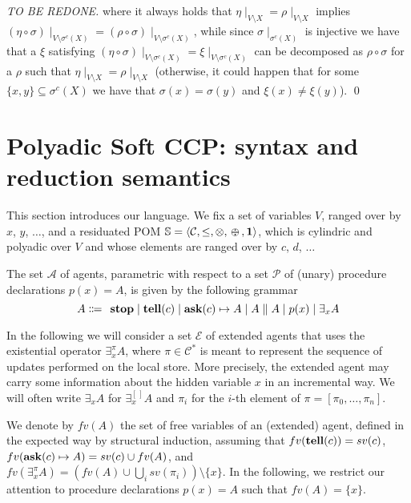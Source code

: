 \documentclass{llncs}
\def\1{{\mathbf 1}}
\newcommand{\tell}{{\bf tell}}
\newcommand{\ask}{{\bf ask}}
\newcommand{\ostop}{{\bf stop}}
\def\1{{\mathbf 1}}
\def\odiv{\, {\ominus\hspace{-7.7pt} \div} \,}
\begin{document}
\begin{proof}[TO BE REDONE]
\noindent
where it always holds that $\eta\mid_{V \setminus X} = \rho\mid_{V \setminus X}$ implies $(\eta\circ \sigma)\mid_{V \setminus \sigma^{c}(X)} = (\rho\circ \sigma)\mid_{V \setminus \sigma^{c}(X)}$,
while since $\sigma \mid_{\sigma^c(X)}$ is injective we have that
a $\xi$ satisfying $(\eta \circ \sigma)\mid_{V \setminus \sigma^{c}(X)} = \xi\mid_{V \setminus \sigma^{c}(X)}$ can be decomposed as $\rho\circ \sigma$
for a $\rho$ such that $\eta\mid_{V \setminus X} = \rho\mid_{V \setminus X}$
(otherwise, it could happen that for some $\{x, y\} \subseteq \sigma^c(X)$ we have that $\sigma(x) =\sigma(y)$ and 
$\xi(x) \neq \xi(y)$).
\qed
\end{proof}

\section{Polyadic Soft CCP: syntax and reduction semantics}\label{sec:detpolyadicCCP}
This section introduces our language.
We fix a set of variables $V$, ranged over by $x$, $y$, $\ldots$, and 
a residuated POM $\mathbb S = \langle {\mathcal C}, \leq, \otimes, \odiv, \1\rangle$, 
which is cylindric and polyadic over $V$ and whose elements
are ranged over by $c$, $d$, $\ldots$

\begin{definition}[Agents]%
The set $\mathcal{A}$ of agents, %
parametric with respect to a set $\mathcal{P}$ of (unary) procedure declarations $p(x) = A$,
is given by the following grammar
\[ A \Coloneqq \: \: \mathit{\ostop} \mid \textit{\tell}(c)  \mid \textit{\ask}(c) \mapsto A \mid A \parallel A \mid %
p(x) \mid \exists_x A\]  
\end{definition}

In the following we will consider 
a set $\mathcal{E}$ of extended agents that uses the existential operator $\exists^{\pi}_x A$, 
where $\pi \in {\mathcal C}^\ast$ is meant to represent the sequence of updates performed on the local store. 
More precisely, the extended agent may carry some information about the hidden variable 
$x$ in an incremental way. We will often write $\exists_x A$ for $\exists^{[ \,]}_x A$ and $\pi_i$ for 
the $i$-th element of $\pi = [ \pi_0, \ldots, \pi_n]$.

We denote by $fv(A)$ the set of free variables of an (extended) agent, defined in the expected way 
by structural induction, assuming that $fv(\tell(c)) = sv(c)$,
$fv(\ask(c) \mapsto A) = sv(c) \cup fv(A)$,
and $fv(\exists^{\pi}_x A) = (fv(A) \cup \bigcup_i sv(\pi_i)) \setminus \{x\}$.
%
In the following, we restrict our attention to 
procedure declarations $p(x) = A$ such that $fv(A) = \{x\}$.
\end{document}
